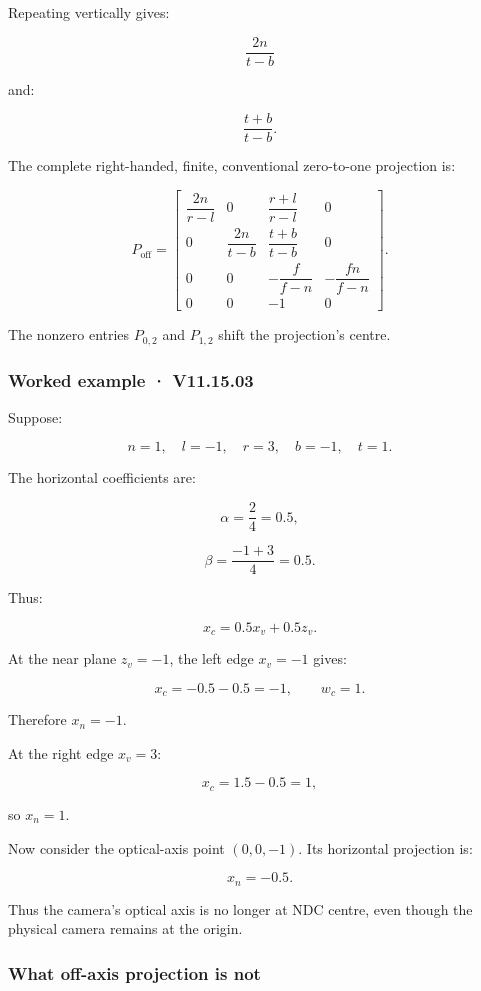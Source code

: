 Repeating vertically gives:

\[ \frac{2n}{t-b} \]

and:

\[ \frac{t+b}{t-b}. \]

The complete right-handed, finite, conventional zero-to-one projection is:

\[ \boxed{ P_{\mathrm{off}}= \begin{bmatrix} \dfrac{2n}{r-l}&0&\dfrac{r+l}{r-l}&0\\ 0&\dfrac{2n}{t-b}&\dfrac{t+b}{t-b}&0\\ 0&0&-\dfrac f{f-n}&-\dfrac{fn}{f-n}\\ 0&0&-1&0 \end{bmatrix}. } \]

The nonzero entries \(P_{0,2}\) and \(P_{1,2}\) shift the projection's centre.

\subsubsection{Worked example · V11.15.03}\label{worked-example-v11.15.03}

Suppose:

\[ n=1,\quad l=-1,\quad r=3,\quad b=-1,\quad t=1. \]

The horizontal coefficients are:

\[ \alpha=\frac{2}{4}=0.5, \]

\[ \beta=\frac{-1+3}{4}=0.5. \]

Thus:

\[ x_c=0.5x_v+0.5z_v. \]

At the near plane \(z_v=-1\), the left edge \(x_v=-1\) gives:

\[ x_c=-0.5-0.5=-1,\qquad w_c=1. \]

Therefore \(x_n=-1\).

At the right edge \(x_v=3\):

\[ x_c=1.5-0.5=1, \]

so \(x_n=1\).

Now consider the optical-axis point \((0,0,-1)\). Its horizontal projection is:

\[ x_n=-0.5. \]

Thus the camera's optical axis is no longer at NDC centre, even though the physical camera remains at the origin.

\subsubsection{What off-axis projection is not}\label{what-off-axis-projection-is-not}


